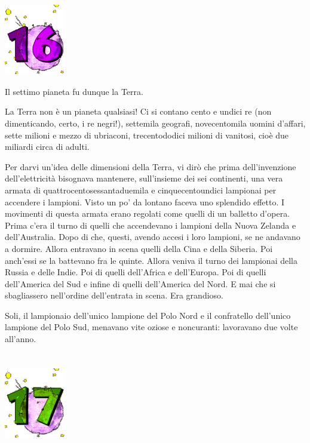 \documentclass[11pt]{scrbook}
\begin{document}
\chapter{}
\begin{center}
\includegraphics{img/chapter16}
\end{center}

Il settimo pianeta fu dunque la Terra.

La Terra non è un pianeta qualsiasi! Ci si contano cento e undici re (non dimenticando, certo, i re negri!), settemila geografi, novecentomila uomini d'affari, sette milioni e mezzo di ubriaconi, trecentododici milioni di vanitosi, cioè due miliardi circa di adulti.

Per darvi un'idea delle dimensioni della Terra, vi dirò che prima dell'invenzione dell'elettricità bisognava mantenere, sull'insieme dei sei continenti, una vera armata di quattrocentosessantaduemila e cinquecentoundici lampionai per accendere i lampioni. Visto un po' da lontano faceva uno splendido effetto. I movimenti di questa armata erano regolati come quelli di un balletto d'opera. Prima c'era il turno di quelli che accendevano i lampioni della Nuova Zelanda e dell'Australia. Dopo di che, questi, avendo accesi i loro lampioni, se ne andavano a dormire. Allora entravano in scena quelli della Cina e della Siberia. Poi anch'essi se la battevano fra le quinte. Allora veniva il turno dei lampionai della Russia e delle Indie. Poi di quelli dell'Africa e dell'Europa. Poi di quelli dell'America del Sud e infine di quelli dell'America del Nord. E mai che si sbagliassero nell'ordine dell'entrata in scena. Era grandioso.

Soli, il lampionaio dell'unico lampione del Polo Nord e il confratello dell'unico lampione del Polo Sud, menavano vite oziose e noncuranti: lavoravano due volte all'anno.

\chapter{}
\begin{center}
\includegraphics{img/chapter17}
\end{center}
\end{document}
